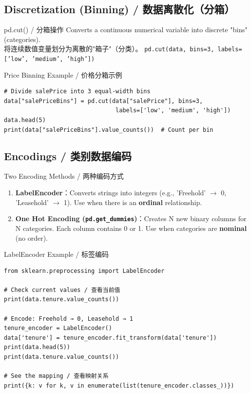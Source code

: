 \documentclass[11pt,a4paper]{article}
\begin{document}
\subsection{Discretization (Binning) / 数据离散化（分箱）}

\begin{concept}{pd.cut() / 分箱操作}
    Converts a continuous numerical variable into discrete "bins" (categories). \\
    将连续数值变量划分为离散的"箱子"（分类）。
    \texttt{pd.cut(data, bins=3, labels=['low', 'medium', 'high'])}
\end{concept}

\begin{examplebox}{Price Binning Example / 价格分箱示例}
\begin{lstlisting}
# Divide salePrice into 3 equal-width bins
data["salePriceBins"] = pd.cut(data["salePrice"], bins=3,
                                labels=['low', 'medium', 'high'])
data.head(5)
print(data["salePriceBins"].value_counts())  # Count per bin
\end{lstlisting}
\end{examplebox}

\subsection{Encodings / 类别数据编码}

\begin{concept}{Two Encoding Methods / 两种编码方式}
    \begin{enumerate}[itemsep=0.5em]
        \item \textbf{LabelEncoder}：Converts strings into integers (e.g., 'Freehold' $\rightarrow$ 0, 'Leasehold' $\rightarrow$ 1). Use when there is an \textbf{ordinal} relationship.
        \item \textbf{One Hot Encoding (\texttt{pd.get\_dummies})}：Creates N new binary columns for N categories. Each column contains 0 or 1. Use when categories are \textbf{nominal} (no order).
    \end{enumerate}
\end{concept}

\begin{examplebox}{LabelEncoder Example / 标签编码}
\begin{lstlisting}
from sklearn.preprocessing import LabelEncoder

# Check current values / 查看当前值
print(data.tenure.value_counts())

# Encode: Freehold → 0, Leasehold → 1
tenure_encoder = LabelEncoder()
data['tenure'] = tenure_encoder.fit_transform(data['tenure'])
print(data.head(5))
print(data.tenure.value_counts())

# See the mapping / 查看映射关系
print({k: v for k, v in enumerate(list(tenure_encoder.classes_))})
\end{lstlisting}
\end{examplebox}
\end{document}
